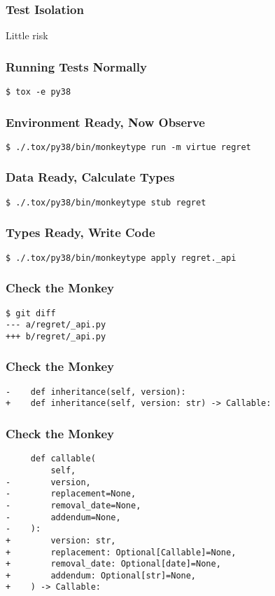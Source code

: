 \begin{frame}
\frametitle{Test Isolation}

Little risk

\end{frame}

\begin{frame}
\frametitle{Running Tests Normally}

\begin{lstlisting}
$ tox -e py38
\end{lstlisting}
\end{frame}

\begin{frame}
\frametitle{Environment Ready, Now Observe}
\begin{lstlisting}
$ ./.tox/py38/bin/monkeytype run -m virtue regret 
\end{lstlisting}
\end{frame}

\begin{frame}
\frametitle{Data Ready, Calculate Types}
\begin{lstlisting}
$ ./.tox/py38/bin/monkeytype stub regret
\end{lstlisting}
\end{frame}

\begin{frame}
\frametitle{Types Ready, Write Code}
\begin{lstlisting}
$ ./.tox/py38/bin/monkeytype apply regret._api
\end{lstlisting}
\end{frame}

\begin{frame}
\frametitle{Check the Monkey}
\begin{lstlisting}
$ git diff
--- a/regret/_api.py
+++ b/regret/_api.py
\end{lstlisting}
\end{frame}

\begin{frame}
\frametitle{Check the Monkey}
\begin{lstlisting}
-    def inheritance(self, version):
+    def inheritance(self, version: str) -> Callable:
\end{lstlisting}
\end{frame}


\begin{frame}
\frametitle{Check the Monkey}
\begin{lstlisting}
     def callable(
         self,
-        version,
-        replacement=None,
-        removal_date=None,
-        addendum=None,
-    ):
+        version: str,
+        replacement: Optional[Callable]=None,
+        removal_date: Optional[date]=None,
+        addendum: Optional[str]=None,
+    ) -> Callable:
\end{lstlisting}
\end{frame}

